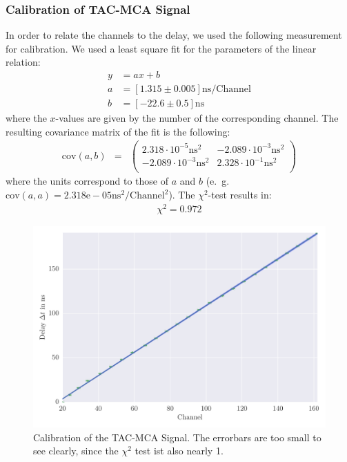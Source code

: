 \subsubsection{Calibration of TAC-MCA Signal}
\label{subs:calib_TAC}
In order to relate the channels to the delay, we used the following
measurement for calibration. We used a least square fit for the parameters
of the linear relation:
\begin{align}
    \label{eq:coeff}
    y &= ax + b \\
    a &= \left[ 1.315 \pm 0.005 \right] \mathrm{ns} / \mathrm{Channel}\\
    b &= \left[ -22.6 \pm 0.5 \right]\mathrm{ns} 
\end{align}
where the $x$-values are given by the number of the corresponding channel. 
The resulting covariance matrix of the fit is the following:
\begin{align}
    \label{eq:cov}
    \mathrm{cov}(a, b) &=& 
    \begin{pmatrix}
        2.318 \cdot 10^{-5}\mathrm{ns}^2 &-2.089\cdot 10^{-3}\mathrm{ns}^2\\
        -2.089\cdot 10^{-3}\mathrm{ns}^2&2.328\cdot 10^{-1}\mathrm{ns}^2\\
    \end{pmatrix}
\end{align}
where the units correspond to those of $a$ and $b$ 
(e.~g. $\mathrm{cov}(a,a) = 2.318\mathrm{e}-05 \mathrm{ns^2} / \mathrm{Channel}^2$).
The $\chi^2$-test results in:
\begin{align}
    \label{eq:}
   \chi^2 = 0.972
\end{align}

\label{sub:calibration_of_tac_mca_signal}
\begin{figure}[htpb]
    \centering
    \includegraphics[width=1.0\linewidth]{analysis/figures/plot7}
    \caption{Calibration of the TAC-MCA Signal. The errorbars are too small
        to see clearly, since the $\chi^2$ test ist also nearly 1.}
    \label{fig:plot7}
\end{figure}



